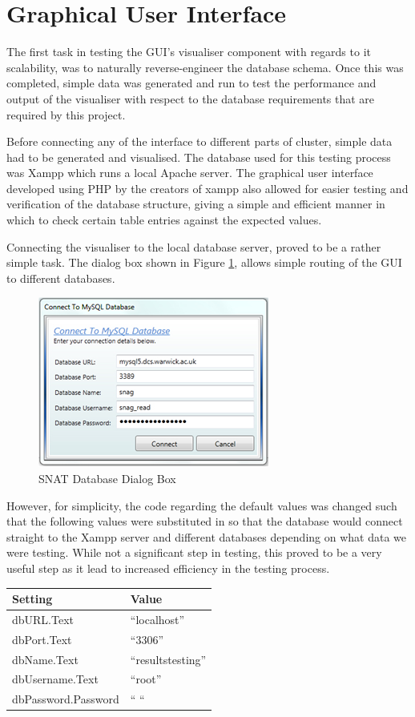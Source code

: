 \section{Graphical User Interface}
The first task in testing the GUI's visualiser component with regards to it scalability, was to naturally reverse-engineer the database schema. Once this was completed, simple data was generated and run to test the performance and output of the visualiser with respect to the database requirements that are required by this project. 

Before connecting any of the interface to different parts of cluster, simple data had to be generated and visualised. The database used for this testing process was Xampp which runs a local Apache server. The graphical user interface developed using PHP by the creators of xampp also allowed for easier testing and verification of the database structure, giving a simple and efficient manner in which to check certain table entries against the expected values.

Connecting the visualiser to the local database server, proved to be a rather simple task. The dialog box shown in Figure \ref{fig:mysql}, allows simple routing of the GUI to different databases. 

\begin{figure}[htbp]%
\centering
\includegraphics[width=0.5\columnwidth]{./img/mysql}%
\caption{SNAT Database Dialog Box}%
\label{fig:mysql}%
\end{figure}

However, for simplicity, the code regarding the default values was changed such that the following values were substituted in so that the database would connect straight to the Xampp server and different databases depending on what data we were testing. While not a significant step in testing, this proved to be a very useful step as it lead to increased efficiency in the testing process.

\begin{table}[htbp]%
\centering
\begin{tabular}{l|l}
Setting & Value \\
\hline
dbURL.Text & ``localhost'' \\
dbPort.Text & ``3306'' \\
dbName.Text & ``resultstesting'' \\
dbUsername.Text & ``root'' \\
dbPassword.Password & `` `` \\
\end{tabular}
\end{table}

